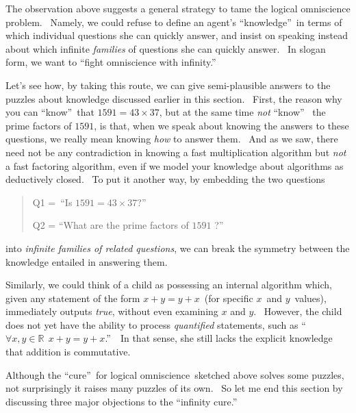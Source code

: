 \documentclass[11pt,onecolumn]{article}%
\begin{document}
The observation above suggests a general strategy to tame the logical
omniscience problem. \ Namely, we could refuse to define an agent's
\textquotedblleft knowledge\textquotedblright\ in terms of which individual
questions she can quickly answer, and insist on speaking instead about which
infinite \textit{families} of questions she can quickly answer. \ In slogan
form, we want to \textquotedblleft fight omniscience with
infinity.\textquotedblright

Let's see how, by taking this route, we can give semi-plausible answers to the
puzzles about knowledge discussed earlier in this section. \ First, the reason
why you can \textquotedblleft know\textquotedblright\ that $1591=43\times37$,
but at the same time \textit{not} \textquotedblleft know\textquotedblright%
\ the prime factors of $1591$, is that, when we speak about knowing the
answers to these questions, we really mean knowing \textit{how} to answer
them. \ And as we saw, there need not be any contradiction in knowing a fast
multiplication algorithm but \textit{not} a fast factoring algorithm, even if
we model your knowledge about algorithms as deductively closed. \ To put it
another way, by embedding the two questions

\begin{quotation}
\noindent Q1 =~\textquotedblleft Is $1591=43\times37$?\textquotedblright

\noindent Q2 = \textquotedblleft What are the prime factors of $1591$%
?\textquotedblright
\end{quotation}

\noindent into \textit{infinite families of related questions}, we can break
the symmetry between the knowledge entailed in answering them.

Similarly, we could think of a child as possessing an internal algorithm
which, given any statement of the form $x+y=y+x$\ (for specific $x$\ and
$y$\ values), immediately outputs \textit{true}, without even examining $x$
and $y$. \ However, the child does not yet have the ability to process
\textit{quantified} statements, such as \textquotedblleft$\forall
x,y\in\mathbb{R}~~x+y=y+x$.\textquotedblright\ \ In that sense, she still
lacks the explicit knowledge that addition is commutative.

Although the \textquotedblleft cure\textquotedblright\ for logical
omniscience\ sketched above solves some puzzles, not surprisingly it raises
many puzzles of its own. \ So let me end this section by discussing three
major objections to the \textquotedblleft infinity cure.\textquotedblright
\end{document}
